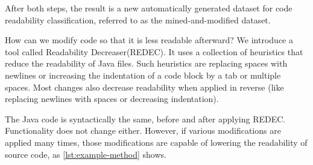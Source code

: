 \documentclass[%
class=scrreprt,
chapterprefix=false,%
open=right,%
twoside=true,%
paper=a4,%
logofile={Logo\_zentral\_farbig\_EN.png},%
thesistype=master,%
UKenglish,%
]{se2thesis}
\newcounter{urlfootnote}
\newcommand{\onecurl}[2]{%
	\stepcounter{urlfootnote}%
	\expandafter\def\csname urlfootnote:#1\endcsname{\theurlfootnote}%
	\footnote{\label{url:#1}\url{#1}, accessed: #2}%
}
\newcommand{\curl}[2]{%
		\onecurl{#1}{#2}%
}
\theoremstyle{definition}
\newcommand{\citeolddataset}{\cite{buse2009learning, dorn2012general, scalabrino2018comprehensive}\xspace}
\newcommand{\RDH}{Readability Decreaser\xspace}
\newcommand{\rdh}{REDEC\xspace}
\newcommand{\RDHa}{\RDH (\rdh)\xspace} %
\begin{document}
	After both steps, the result is a new automatically generated dataset for code readability classification, referred to as the mined-and-modified dataset.
	
	How can we modify code so that it is less readable afterward? We introduce a tool called \RDHa. It uses a collection of heuristics that reduce the readability of Java files. Such heuristics are replacing spaces with newlines or increasing the indentation of a code block by a tab or multiple spaces. Most changes also decrease readability when applied in reverse (like replacing newlines with spaces or decreasing indentation).
	
	The Java code is syntactically the same, before and after applying \rdh. Functionality does not change either. However, if various modifications are applied many times, those modifications are capable of lowering the readability of source code, as \autoref{lst:example-method} shows.

%	
\end{document}
